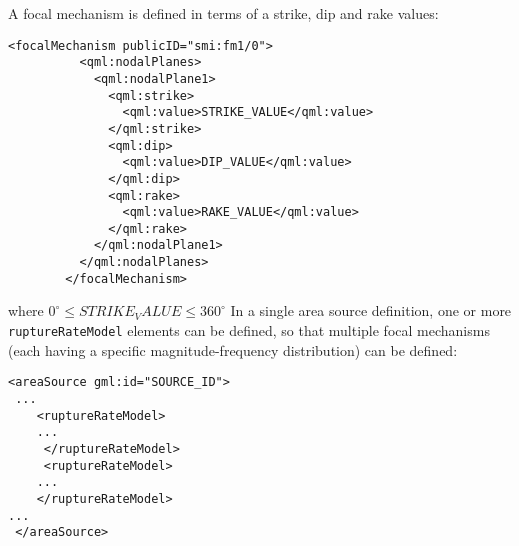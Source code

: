 A focal mechanism is defined in terms of a strike, dip and rake values:
\begin{Verbatim}[frame=single]
        <focalMechanism publicID="smi:fm1/0">
          <qml:nodalPlanes>
            <qml:nodalPlane1>
              <qml:strike>
                <qml:value>STRIKE_VALUE</qml:value>
              </qml:strike>
              <qml:dip>
                <qml:value>DIP_VALUE</qml:value>
              </qml:dip>
              <qml:rake>
                <qml:value>RAKE_VALUE</qml:value>
              </qml:rake>
            </qml:nodalPlane1>
          </qml:nodalPlanes>
        </focalMechanism>
 \end{Verbatim}
where $ 0^{\circ} \leq STRIKE_VALUE  \leq 360 ^{\circ}$
In a single area source definition, one or more \Verb+ruptureRateModel+ elements can be defined, so that multiple focal mechanisms (each having a specific magnitude-frequency distribution) can be defined:
\begin{Verbatim}[frame=single]
 <areaSource gml:id="SOURCE_ID">
 ...
 	<ruptureRateModel>
 	...
	 </ruptureRateModel>
	 <ruptureRateModel>
 	...
 	</ruptureRateModel>
...
 </areaSource>
\end{Verbatim}
\begin{comment}
\begin{Verbatim}[frame=single]
    <areaSource gml:id="src_1">
      <gml:name>Source 8.CH.3</gml:name>
      <tectonicRegion>Active Shallow Crust</tectonicRegion>
      <areaBoundary>
        <gml:Polygon>
          <gml:exterior>
            <gml:LinearRing>
              <gml:posList>-0.5 -0.5 -0.5 0.5 0.5 0.5 0.5 -0.5</gml:posList>
            </gml:LinearRing>
          </gml:exterior>
        </gml:Polygon>
      </areaBoundary>
      <ruptureRateModel>
        <truncatedGutenbergRichter>
          <aValueCumulative>2.5</aValueCumulative>
          <bValue>0.7318999871612379</bValue>
          <minMagnitude>5.0</minMagnitude>
          <maxMagnitude>8.0</maxMagnitude>
        </truncatedGutenbergRichter>
        <focalMechanism publicID="smi:fm1/0">
          <qml:nodalPlanes>
            <qml:nodalPlane1>
              <qml:strike>
                <qml:value>0.0</qml:value>
              </qml:strike>
              <qml:dip>
                <qml:value>90.0</qml:value>
              </qml:dip>
              <qml:rake>
                <qml:value>0.0</qml:value>
              </qml:rake>
            </qml:nodalPlane1>
          </qml:nodalPlanes>
        </focalMechanism>
      </ruptureRateModel>
      <ruptureDepthDistribution>
        <magnitude>6.5 7.5</magnitude>
        <depth>2.5 0.0</depth>
      </ruptureDepthDistribution>
      <hypocentralDepth>5.0</hypocentralDepth>
    </areaSource>
\end{Verbatim}
\end{comment}
